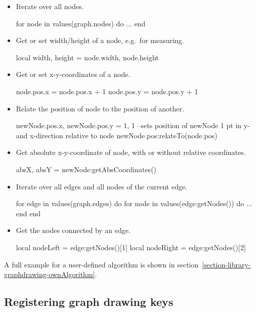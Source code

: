 \begin{itemize}
\item Iterate over all nodes.
\begin{codeexample}
for node in values(graph.nodes) do
   ...
end
\end{codeexample}
\item Get or set width/height of a node, e.g.\ for measuring.
\begin{codeexample}
local width, height = node.width, node.height
\end{codeexample}
\item Get or set x-y-coordinates of a node.
\begin{codeexample}
node.pos.x = node.pos.x + 1
node.pos.y = node.pos.y + 1
\end{codeexample}
\item Relate the position of node to the position of another.
\begin{codeexample}
newNode.pos.x, newNode.pos.y = 1, 1
--sets position of newNode 1 pt in y- and x-direction relative to node
newNode.pos:relateTo(node.pos)
\end{codeexample}
\item Get absolute x-y-coordinate of node, with or without relative coordinates.
\begin{codeexample}
absX, absY = newNode:getAbsCoordinates()
\end{codeexample}
\item Iterate over all edges and all nodes of the current edge.
\begin{codeexample}
for edge in values(graph.edges) do
   for node in values(edge:getNodes()) do
      ...
   end
end
\end{codeexample}
\item Get the nodes connected by an edge.
\begin{codeexample}
local nodeLeft = edge:getNodes()[1]
local nodeRight = edge:getNodes()[2]
\end{codeexample}
\end{itemize}

A full example for a user-defined algorithm is shown in
section~\ref{section-library-graphdrawing-ownAlgorithm}.

\subsection{Registering graph drawing keys}
\label{section-base-graphdrawing-registerKeys}

